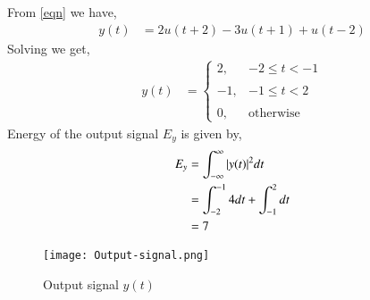 \documentclass[journal,12pt,twocolumn]{IEEEtran}
\begin{document}
From \eqref{eqn} we have,
\begin{align}
    y(t) &= 2u(t+2) -3u(t+1) + u(t-2) 
\end{align}
Solving we get,
\begin{align}
      y(t) &= 
     \begin{cases}
    2, & -2 \leq t < -1 \\~\\[-1em]
	-1, & -1 \leq t < 2 \\~\\[-1em]
	0, & \text{otherwise}
	\end{cases}
\end{align}
Energy of the output signal $E_y$ is given by,
\begin{align}
    E_y &= \int_{-\infty}^{\infty}\vert y(t)\vert^2dt\\
    &= \int_{-2}^{-1}4dt + \int_{-1}^{2}dt\\
    &= 7
\end{align}
\begin{figure}[h!]
\centering
\texttt{[image: Output-signal.png]}
\caption{Output signal $y(t)$}
\label{fig:ellipse}
\end{figure}
\end{document}
